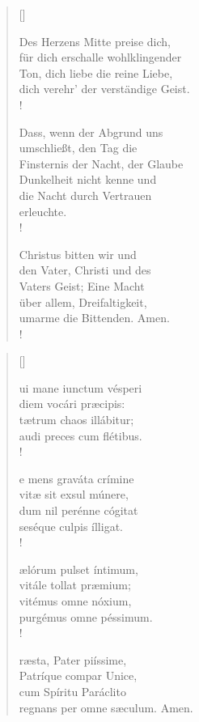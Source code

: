 \begin{multicols}{2}
\begin{verse}[\versewidth]
{{ Des Herzens Mitte preise dich,\\
für dich erschalle wohlklingender\\
Ton, dich liebe die reine Liebe,\\
dich verehr' der verständige Geist.\\!

 Dass, wenn der Abgrund uns\\
umschließt, den Tag die\\
Finsternis der Nacht, der Glaube\\
Dunkelheit nicht kenne und\\
die Nacht durch Vertrauen\\
erleuchte.\\!

 Christus bitten wir und\\
den Vater, Christi und des\\
Vaters Geist; Eine Macht\\
über allem, Dreifaltigkeit,\\
umarme die Bittenden. Amen.\\!}}
 
 
\end{verse}

\end{multicols}

\medskip

\def\greinitialformat#1{{\fontsize{40}{40}\selectfont #1}}
\gresetfirstlineaboveinitial{\small \textcolor{red}{æstate}}{}
\setaboveinitialseparation{0.72mm}


\vspace{0.3cm}
\begin{verse}[\versewidth]
 

ui mane iunctum vésperi\\
diem vocári præcipis:\\
tætrum chaos illábitur;\\
audi preces cum flétibus.\\!

e mens graváta crímine\\
vitæ sit exsul múnere,\\ 
dum nil perénne cógitat\\
seséque culpis ílligat.\\!

ælórum pulset íntimum,\\
vitále tollat præmium;\\
vitémus omne nóxium,\\ 
purgémus omne péssimum.\\!

ræsta, Pater piíssime,\\ 
Patríque compar Unice,\\ 
cum Spíritu Paráclito\\
regnans per omne sæculum. Amen.


\end{verse}

